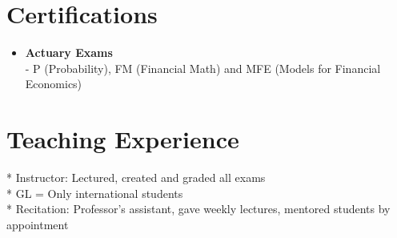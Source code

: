 \documentclass[letterpaper,12pt]{article}
\begin{document}
\section{Certifications}
\begin{itemize}
	\item \textbf{Actuary Exams} \vspace{.05in}\\
	- P (Probability), FM (Financial Math) and MFE (Models for Financial Economics)
\end{itemize}

\section{Teaching Experience}
		* Instructor: Lectured, created and graded all exams \\  \vspace{.05in}
* GL = Only international students \\
* Recitation: Professor's assistant, gave weekly lectures, mentored students by appointment
\end{document}
